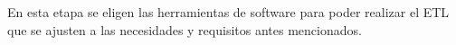 En esta etapa se eligen las herramientas de software para poder realizar el ETL que se ajusten a las necesidades y requisitos antes mencionados.

